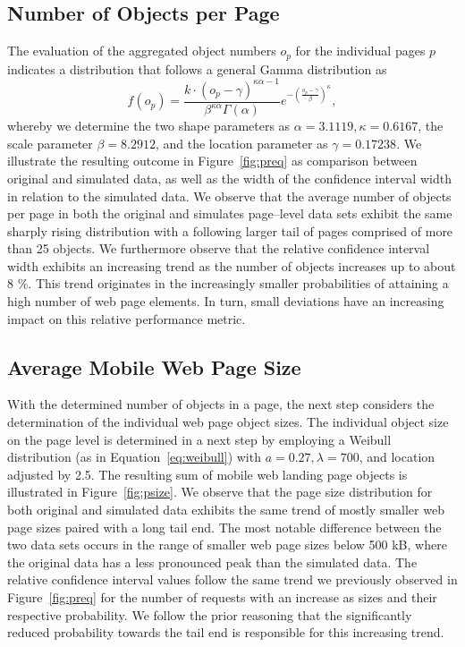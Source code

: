 \documentclass[letterpaper,conference]{IEEEtran}
\begin{document}
\subsection{Number of Objects per Page}
The evaluation of the aggregated object numbers ${o}_p$ for the individual pages $p$ indicates a distribution that follows a general Gamma distribution as 
\begin{equation*}\label{eq:gg}
f(o_p) = \frac{ k \cdot (o_p-\gamma)^{\kappa\alpha-1} }{\beta^{\kappa\alpha}\Gamma(\alpha)}e^{-\left(\frac{o_p-\gamma}{\beta}\right)^\kappa},
\end{equation*}
whereby we determine the two shape parameters as $\alpha=3.1119, \kappa=0.6167$, the scale parameter $\beta=8.2912$, and the location parameter as $\gamma=0.17238$.
%
We illustrate the resulting outcome in Figure~\ref{fig:preq} as comparison between original and simulated data, as well as the  width of the confidence interval width in relation to the simulated data.
We observe that the average number of objects per page in both the original and simulates page--level data sets exhibit the same sharply rising distribution with a following larger tail of pages comprised of more than 25 objects.
We furthermore observe that the relative confidence interval width exhibits an increasing trend as the number of objects increases up to about 8 \%. 
This trend originates in the increasingly smaller probabilities of attaining a high number of web page elements. In turn, small deviations have an increasing impact on this relative performance metric. 



\subsection{Average Mobile Web Page Size}
With the determined number of objects in a page, the next step considers the determination of the individual web page object sizes.
The individual object size on the page level is determined in a next step by employing a Weibull distribution (as in Equation~\ref{eq:weibull}) with $a=0.27 ,\lambda=700$, and location adjusted by 2.5.
The resulting sum of mobile web landing page objects is illustrated in Figure~\ref{fig:psize}.
We observe that the page size distribution for both original and simulated data  exhibits the same trend of mostly smaller web page sizes paired with a long tail end.
The most notable difference between the two data sets occurs in the range of smaller web page sizes below 500 kB, where the original data has a less pronounced peak than the simulated data.
The relative confidence interval values follow the same trend we previously observed in Figure~\ref{fig:preq} for the number of requests with an increase as sizes and their respective probability.
We follow the prior reasoning that the significantly reduced probability towards the tail end is responsible for this increasing trend.  
\end{document}
